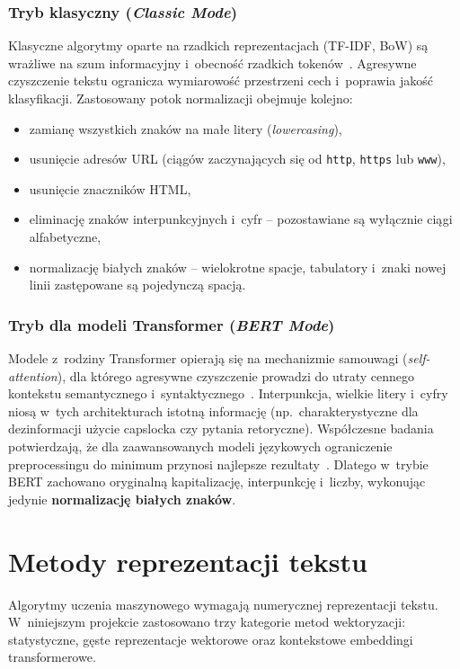 \documentclass[oneside,polski,logo]{amuthesis}
\begin{document}
\subsubsection*{Tryb klasyczny (\textit{Classic Mode})}

Klasyczne algorytmy oparte na rzadkich reprezentacjach (TF-IDF, BoW) są wrażliwe na szum informacyjny i~obecność rzadkich tokenów~\cite{AIZAWA200345}. Agresywne czyszczenie tekstu ogranicza wymiarowość przestrzeni cech i~poprawia jakość klasyfikacji. Zastosowany potok normalizacji obejmuje kolejno:
\begin{itemize}
    \item zamianę wszystkich znaków na małe litery (\textit{lowercasing}),
    \item usunięcie adresów URL (ciągów zaczynających się od \texttt{http}, \texttt{https} lub \texttt{www}),
    \item usunięcie znaczników HTML,
    \item eliminację znaków interpunkcyjnych i~cyfr -- pozostawiane są wyłącznie ciągi alfabetyczne,
    \item normalizację białych znaków -- wielokrotne spacje, tabulatory i~znaki nowej linii zastępowane są pojedynczą spacją.
\end{itemize}

\subsubsection*{Tryb dla modeli Transformer (\textit{BERT Mode})}

Modele z~rodziny Transformer opierają się na mechanizmie samouwagi (\textit{self-attention}), dla którego agresywne czyszczenie prowadzi do utraty cennego kontekstu semantycznego i~syntaktycznego~\cite{camachocollados2018role}. Interpunkcja, wielkie litery i~cyfry niosą w~tych architekturach istotną informację (np.\ charakterystyczne dla dezinformacji użycie capslocka czy pytania retoryczne). Współczesne badania potwierdzają, że dla zaawansowanych modeli językowych ograniczenie preprocessingu do minimum przynosi najlepsze rezultaty~\cite{SIINO2024102342}. Dlatego w~trybie BERT zachowano oryginalną kapitalizację, interpunkcję i~liczby, wykonując jedynie \textbf{normalizację białych znaków}.

\section{Metody reprezentacji tekstu}
Algorytmy uczenia maszynowego wymagają numerycznej reprezentacji tekstu. W~niniejszym projekcie zastosowano trzy kategorie metod wektoryzacji: statystyczne, gęste reprezentacje wektorowe oraz kontekstowe embeddingi transformerowe.
\end{document}

